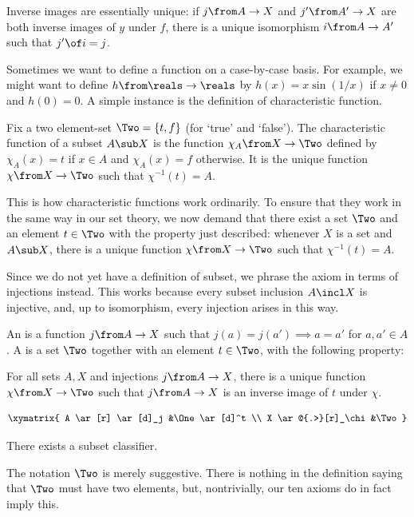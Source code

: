\documentclass[12pt]{article}
\begin{document}
Inverse images are essentially unique: if $j\from A \to X$ and
$j'\from A' \to X$ are both inverse images of $y$ under $f$, there is a
unique isomorphism $i \from A \to A'$ such that $j' \of i = j$. 


% 
Sometimes we want to define a function on a case-by-case basis.  For
example, we might want to define $h\from \reals \to \reals$ by $h(x) = x
\sin(1/x)$ if $x \neq 0$ and $h(0) = 0$.  A simple instance is the
definition of characteristic function.

Fix a two element-set $\Two = \{t, f\}$ (for `true' and `false').  The
characteristic function of a subset $A \sub X$ is the function $\chi_A
\from X \to \Two$ defined by $\chi_A(x) = t$ if $x \in A$ and $\chi_A(x)
= f$ otherwise.  It is the unique function $\chi\from X \to \Two$ such
that $\chi^{-1}(t) = A$.  

This is how characteristic functions work ordinarily.  To ensure that they
work in the same way in our set theory, we now demand that there exist a
set $\Two$ and an element $t \in \Two$ with the property just described:
whenever $X$ is a set and $A \sub X$, there is a unique function $\chi\from
X \to \Two$ such that $\chi^{-1}(t) = A$.

Since we do not yet have a definition of subset, we phrase the axiom in
terms of injections instead.  This works because every subset inclusion $A
\incl X$ is injective, and, up to isomorphism, every injection arises in
this way.

\begin{dfn}
An  is a function $j \from A \to X$ such that $j(a) =
j(a') \implies a = a'$ for $a, a' \in A$. A  is a set $\Two$ together with an element $t \in
\Two$, with the following property:

\medskip\noindent
For all sets $A, X$ and injections $j\from A \to X$,
there is a unique function $\chi\from X \to \Two$ such that
$j\from A \to X$ is an inverse image of $t$ under $\chi$.
\end{dfn}
\[
\xymatrix{
A \ar[r] \ar[d]_j       &\One \ar[d]^t  \\
X \ar@{.>}[r]_\chi      &\Two
}
\]
% 
\begin{axiom}
There exists a subset classifier.
\end{axiom}

The notation $\Two$ is merely suggestive.  There is nothing in the
definition saying that $\Two$ must have two elements, but, nontrivially,
our ten axioms do in fact imply this.
\end{document}
